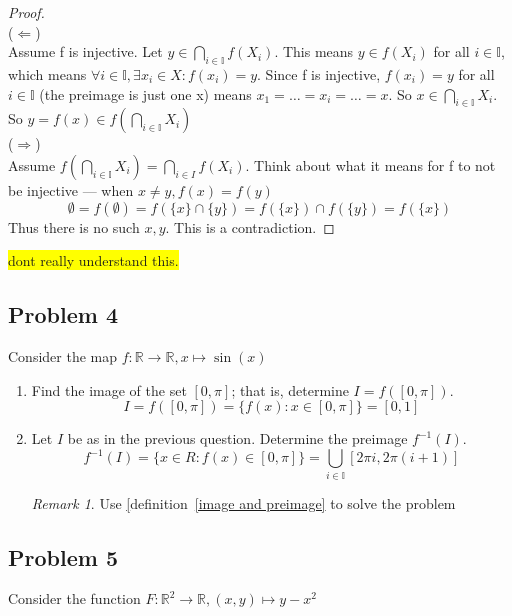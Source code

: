 \documentclass[11pt]{article}
\theoremstyle{plain}%
\theoremstyle{definition}
\theoremstyle{remark}
\newtheorem*{rem}{Remark}
\newcommand{\R}{\mathbb{R}}
\newcommand{\I}{\mathbb{I}}
\newcommand{\hilight}[1]{\colorbox{yellow}{#1}}
\begin{document}
\begin{enumerate}
    \begin{proof}
      $ $\\
      ($\Leftarrow$) \\
      Assume f is injective. Let $y \in \bigcap_{i\in \I} f(X_i)$. This means $y \in f(X_i)$ for all $i \in \I$, which means $\forall i \in\I, \exists x_i \in X: f(x_i) = y$. Since f is injective, $f(x_i) = y$ for all $i \in\I$ (the preimage is just one x) means $x_1 = \dots = x_i = \dots = x$. So $x\in\bigcap_{i\in\I}X_i$. So $y=f(x)\in f(\bigcap_{i \in\I} X_i)$ \\
      ($\Rightarrow$) \\
      Assume $f\left(\bigcap_{i\in \I} X_{i}\right) = \bigcap_{i\in I} f(X_{i})$. Think about what it means for f to not be injective --- when $x\neq y, f(x) = f(y)$
      \[
        \emptyset = f(\emptyset) = f(\{x\}\cap\{y\}) = f(\{x\})\cap f(\{y\}) = f(\{x\})
      \]
      Thus there is no such $x,y$. This is a contradiction.
    \end{proof}

    \hilight{dont really understand this.}
\end{enumerate}

\subsection*{Problem 4}
Consider the map $f: \R \to \R, x \mapsto \sin(x)$

\begin{enumerate}
  \item Find the image of the set $[0,\pi]$; that is, determine $I = f([0,\pi])$. \\
  \[
    I = f([0,\pi]) = \{f(x): x \in [0, \pi]\} = [0, 1]
  \]
  \item Let $I$ be as in the previous question. Determine the preimage $f^{-1}(I)$. \\
  \[
    f^{-1}(I) = \{ x \in R: f(x) \in [0, \pi]\} = \bigcup_{i\in\I} [2\pi i, 2\pi(i+1)]
  \]

  \begin{rem}
    Use \hyperref[image and preimage][definition~\eqref{image and preimage} to solve the problem
  \end{rem}
\end{enumerate}


\subsection*{Problem 5}
Consider the function $F: \R^2 \to \R, (x,y) \mapsto y - x^2$
\end{document}

